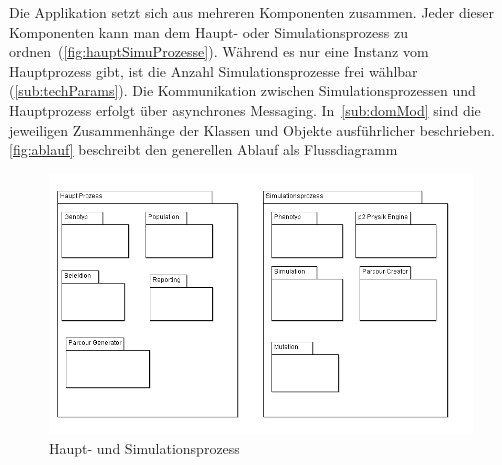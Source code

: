     Die Applikation setzt sich aus mehreren Komponenten zusammen.
    Jeder dieser Komponenten kann man dem Haupt- oder Simulationsprozess zu ordnen~(\vref{fig:hauptSimuProzesse}).
    Während es nur eine Instanz vom Hauptprozess gibt, ist die Anzahl Simulationsprozesse frei wählbar (\vref{sub:techParams}).
    Die Kommunikation zwischen Simulationsprozessen und Hauptprozess erfolgt über asynchrones Messaging.
    In~\vref{sub:domMod} sind die jeweiligen Zusammenhänge der Klassen und Objekte ausführlicher beschrieben.
    \vref{fig:ablauf} beschreibt den generellen Ablauf als Flussdiagramm

    \begin{figure}[H]
      \includegraphics[scale=0.45,center]{graphics/haupt_simulations_prozess}
      \caption{Haupt- und Simulationsprozess\label{fig:hauptSimuProzesse}}
    \end{figure}
